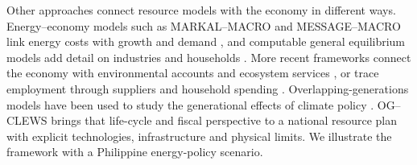 Other approaches connect resource models with the economy in different ways.
Energy--economy models such as MARKAL--MACRO and MESSAGE--MACRO link energy costs with
growth and demand \citep{manne_wene_1992,messner_schrattenholzer_2000}, and computable
general equilibrium models add detail on industries and households
\citep{bohringer_rutherford_2008,rausch_2011}. More recent frameworks connect the economy
with environmental accounts and ecosystem services \citep{banerjee_ieem_2020}, or trace
employment through suppliers and household spending \citep{bararzadeh_clews_io_2026}.
Overlapping-generations models have been used to study the generational effects of
climate policy \citep{kotlikoff_2021}. OG--CLEWS brings that life-cycle and fiscal
perspective to a national resource plan with explicit technologies, infrastructure and
physical limits. We illustrate the framework with a Philippine energy-policy scenario.
